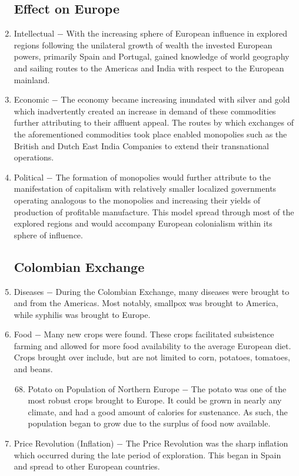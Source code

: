 \documentclass[12pt]{article}
\begin{document}
\begin{enumerate}
\subsection{Effect on Europe}

\item Intellectual $-$ With the increasing sphere of European influence in explored regions following the unilateral growth of wealth the invested European powers, primarily Spain and Portugal, gained knowledge of world geography and sailing routes to the Americas and India with respect to the European mainland.

\item Economic $-$ The economy became increasing inundated with silver and gold which inadvertently created an increase in demand of these commodities further attributing to their affluent appeal. The routes by which exchanges of the aforementioned commodities took place enabled monopolies such as the British and Dutch East India Companies to extend their transnational operations.

\item Political $-$ The formation of monopolies would further attribute to the manifestation of capitalism with relatively smaller localized governments operating analogous to the monopolies and increasing their yields of production of profitable manufacture. This model spread through most of the explored regions and would accompany European colonialism within its sphere of influence.

\subsection{Colombian Exchange} 

\item Diseases $-$ During the Colombian Exchange, many diseases were brought to and from the Americas. Most notably, smallpox was brought to America, while syphilis was brought to Europe.

\item Food $-$ Many new crops were found. These crops facilitated subsistence farming and allowed for more food availability to the average European diet. Crops brought over include, but are not limited to corn, potatoes, tomatoes, and beans.

\begin{enumerate}[label=\arabic{*}.]
\setcounter{enumii}{67}
\item Potato on Population of Northern Europe $-$ The potato was one of the most robust crops brought to Europe. It could be grown in nearly any climate, and had a good amount of calories for sustenance. As such, the population began to grow due to the surplus of food now available.
\end{enumerate}
\setcounter{enumi}{68}
\item Price Revolution (Inflation) $-$ The Price Revolution was the sharp inflation which occurred during the late period of exploration. This began in Spain and spread to other European countries.


\end{enumerate}
\end{document}
